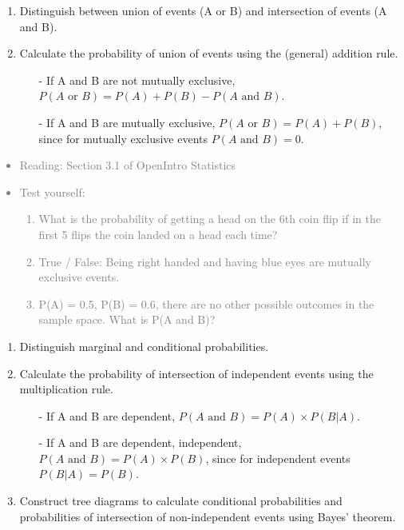 \documentclass[11pt]{article}
\newcommand{\gray}[1]{\textcolor{gray}{#1}}
\begin{document}
\begin{enumerate}
\item Distinguish between union of events (A or B) and intersection of events (A and B).

\item Calculate the probability of union of events using the (general) addition rule.
\begin{itemize}
\item[-] If A and B are not mutually exclusive, $P(A \text{ or } B) = P(A) + P(B) - P(A \text{ and } B)$.
\item[-] If A and B are mutually exclusive, $P(A \text{ or } B) = P (A) + P (B)$, since for mutually exclusive events $P(A \text{ and } B) = 0$.
\end{itemize}

\end{enumerate}

\gray{
{\it
\vspace{-0.75cm}
\begin{itemize}
\renewcommand{\labelitemi}{{\textcolor{dark}{$\ast$}}}
\item Reading: Section 3.1 of OpenIntro Statistics
\item Test yourself:
\begin{enumerate}
\item What is the probability of getting a head on the 6th coin flip if in the first 5 flips the coin landed on a head each time?
\item True / False: Being right handed and having blue eyes are mutually exclusive events.
\item P(A) = 0.5, P(B) = 0.6, there are no other possible outcomes in the sample space. What is P(A and B)?
\end{enumerate}
\end{itemize}
}}


%

\vspace{0.48cm}

%

\begin{enumerate}[resume]
\renewcommand\labelenumi{\textcolor{light}{\textbf{LO \theenumi.}}}

\item Distinguish marginal and conditional probabilities.

\item Calculate the probability of intersection of independent events using the multiplication rule.
\begin{itemize}
\item[-] If A and B are dependent, $P(A \text{ and } B) = P(A) \times P(B | A)$.
\item[-] If A and B are dependent, independent, $P(A \text{ and } B) = P(A) \times P(B)$,  since for independent events $P(B | A) = P(B)$.
\end{itemize}

\item Construct tree diagrams to calculate conditional probabilities and probabilities of intersection of non-independent events using Bayes' theorem.

\end{enumerate}
\end{document}
